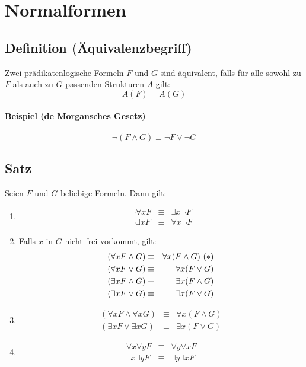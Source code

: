\documentclass[a4paper,twoside,DIV15,BCOR12mm]{scrbook}
\begin{document}
\section{Normalformen}

\subsection{Definition (Äquivalenzbegriff)}

Zwei prädikatenlogische Formeln $F$ und $G$ sind äquivalent, falls für alle sowohl zu $F$ als auch zu $G$ passenden Strukturen $A$ gilt: $$A(F) = A(G)$$

\paragraph{Beispiel (de Morgansches Gesetz)} \[\neg (F \wedge G) \equiv \neg F \vee \neg G\]

\subsection{Satz}

Seien $F$ und $G$ beliebige Formeln. Dann gilt:
\begin{enumerate}
\item
\begin{eqnarray*}
	\neg \forall xF & \equiv & \exists x\neg F \\
	\neg \exists xF & \equiv & \forall x\neg F
\end{eqnarray*}
\item Falls $x$ in $G$ nicht frei vorkommt, gilt:
\begin{eqnarray*}
	(\forall xF\wedge G) & \equiv & \forall x(F\wedge G) \hfill ~(*) \\
	(\forall xF\vee G) & \equiv & \forall x(F\vee G) \\
	(\exists xF\wedge G) & \equiv & \exists x(F \wedge G) \\
	(\exists xF\vee G) & \equiv & \exists x(F \vee G)
\end{eqnarray*}
\item
\begin{eqnarray*}
	(\forall xF \wedge \forall xG) & \equiv & \forall x(F \wedge G) \\
	(\exists xF \vee \exists xG) & \equiv & \exists x(F \vee G)
\end{eqnarray*}
\item
\begin{eqnarray*}
	\forall x\forall yF & \equiv & \forall y\forall xF \\
	\exists x\exists yF & \equiv & \exists y\exists xF
\end{eqnarray*}
\end{enumerate}
\end{document}
